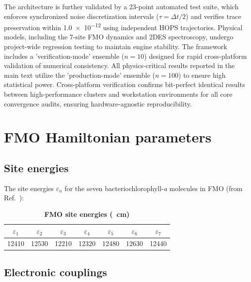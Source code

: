 \documentclass[11pt,a4paper]{article}
\begin{document}
The architecture is further validated by a 23-point automated test suite, which enforces synchronized noise discretization intervals ($\tau = \Delta t/2$) and verifies trace preservation within \num{1.0e-12} using independent HOPS trajectories. Physical models, including the 7-site FMO dynamics and 2DES spectroscopy, undergo project-wide regression testing to maintain engine stability. The framework includes a 'verification-mode' ensemble ($n=10$) designed for rapid cross-platform validation of numerical consistency. All physics-critical results reported in the main text utilize the 'production-mode' ensemble ($n=100$) to ensure high statistical power. Cross-platform verification confirms bit-perfect identical results between high-performance clusters and workstation environments for all core convergence audits, ensuring hardware-agnostic reproducibility.



\section{FMO Hamiltonian parameters}
\label{sec:S2}

\subsection{Site energies}

The site energies $\varepsilon_n$ for the seven bacteriochlorophyll-\textit{a} molecules in FMO (from Ref.\ \cite{Adolphs2006}):

\begin{table}[htb]
\centering
\caption{\textbf{FMO site energies (\si{\per\centi\meter})}}
\label{tab:SI_site_energies}
\begin{tabular}{ccccccc}
\toprule
$\varepsilon_1$ & $\varepsilon_2$ & $\varepsilon_3$ & $\varepsilon_4$ & $\varepsilon_5$ & $\varepsilon_6$ & $\varepsilon_7$ \\
\midrule
12410 & 12530 & 12210 & 12320 & 12480 & 12630 & 12440 \\
\bottomrule
\end{tabular}
\end{table}

\subsection{Electronic couplings}
\end{document}
